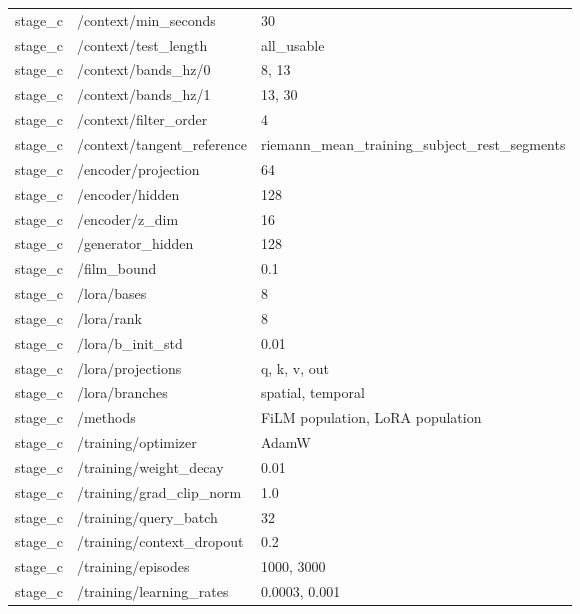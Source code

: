 \begin{longtable}{p{.65in}p{2.8in}p{3.2in}}
stage\_\allowbreak{}c & /context/min\_\allowbreak{}seconds & 30 \\
stage\_\allowbreak{}c & /context/test\_\allowbreak{}length & all\_\allowbreak{}usable \\
stage\_\allowbreak{}c & /context/bands\_\allowbreak{}hz/0 & 8, 13 \\
stage\_\allowbreak{}c & /context/bands\_\allowbreak{}hz/1 & 13, 30 \\
stage\_\allowbreak{}c & /context/filter\_\allowbreak{}order & 4 \\
stage\_\allowbreak{}c & /context/tangent\_\allowbreak{}reference & riemann\_\allowbreak{}mean\_\allowbreak{}training\_\allowbreak{}subject\_\allowbreak{}rest\_\allowbreak{}segments \\
stage\_\allowbreak{}c & /encoder/projection & 64 \\
stage\_\allowbreak{}c & /encoder/hidden & 128 \\
stage\_\allowbreak{}c & /encoder/z\_\allowbreak{}dim & 16 \\
stage\_\allowbreak{}c & /generator\_\allowbreak{}hidden & 128 \\
stage\_\allowbreak{}c & /film\_\allowbreak{}bound & 0.1 \\
stage\_\allowbreak{}c & /lora/bases & 8 \\
stage\_\allowbreak{}c & /lora/rank & 8 \\
stage\_\allowbreak{}c & /lora/b\_\allowbreak{}init\_\allowbreak{}std & 0.01 \\
stage\_\allowbreak{}c & /lora/projections & q, k, v, out \\
stage\_\allowbreak{}c & /lora/branches & spatial, temporal \\
stage\_\allowbreak{}c & /methods & FiLM population, LoRA population \\
stage\_\allowbreak{}c & /training/optimizer & AdamW \\
stage\_\allowbreak{}c & /training/weight\_\allowbreak{}decay & 0.01 \\
stage\_\allowbreak{}c & /training/grad\_\allowbreak{}clip\_\allowbreak{}norm & 1.0 \\
stage\_\allowbreak{}c & /training/query\_\allowbreak{}batch & 32 \\
stage\_\allowbreak{}c & /training/context\_\allowbreak{}dropout & 0.2 \\
stage\_\allowbreak{}c & /training/episodes & 1000, 3000 \\
stage\_\allowbreak{}c & /training/learning\_\allowbreak{}rates & 0.0003, 0.001 \\

\end{longtable}
